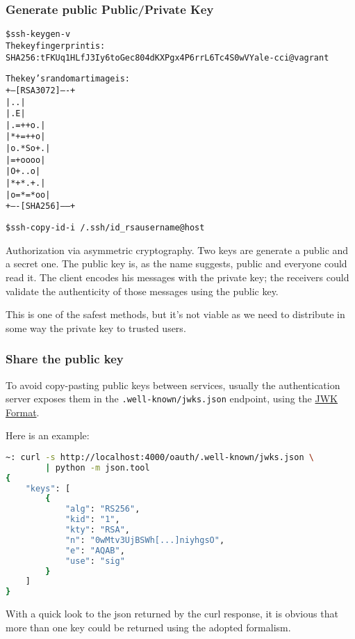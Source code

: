 \subsubsection{Generate public Public/Private Key}
\begin{alltt}
    \$ ssh-keygen -v
    The key fingerprint is:
    SHA256:tFKUq1HLfJ3Iy6toGec804dKXPgx4P6rrL6Tc4S0wVY ale-cci@vagrant

    The key's randomart image is:
    +---[RSA 3072]----+
    |        ..       |
    |       .E        |
    |     . =++ o .   |
    |      *+=++ o    |
    |     o.*So+.     |
    |      =+oooo     |
    |       O+..o     |
    |      *+*.+ .    |
    |     o=*=*oo     |
    +----[SHA256]-----+


    \$ ssh-copy-id -i ~/.ssh/id_rsa username@host
\end{alltt}
Authorization via asymmetric cryptography. Two keys are generate a public and a secret one.
The public key is, as the name suggests, public and everyone could read it.
The client encodes his messages with the private key; the receivers could validate the authenticity of those messages using the public key.

This is one of the safest methods, but it's not viable as we need to distribute in some way the private key to
trusted users.

\subsubsection{Share the public key}
\label{jwks}
To avoid copy-pasting public keys between services, usually the authentication
server exposes them in the \texttt{.well-known/jwks.json} endpoint, using the
\href{https://tools.ietf.org/html/rfc7517#section-4}{JWK Format}.

Here is an example:

\begin{lstlisting}[language=bash]
~: curl -s http://localhost:4000/oauth/.well-known/jwks.json \
        | python -m json.tool
{
    "keys": [
        {
            "alg": "RS256",
            "kid": "1",
            "kty": "RSA",
            "n": "0wMtv3UjBSWh[...]niyhgsO",
            "e": "AQAB",
            "use": "sig"
        }
    ]
}
\end{lstlisting}
With a quick look to the json returned by the curl response, it is obvious that
more than one key could be returned using the adopted formalism.

